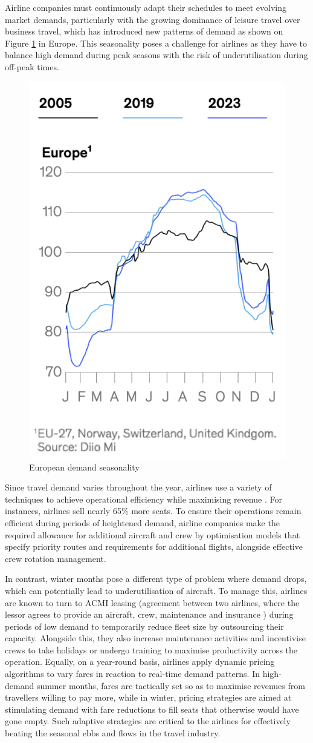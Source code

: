 \documentclass[conference]{IEEEtran}
\begin{document}
Airline companies must continuously adapt their schedules to meet evolving market demands, particularly with the growing dominance of leisure travel over business travel, which has introduced new patterns of demand as shown on Figure \ref{fig:European_demand_seasonality} in Europe. This seasonality poses a challenge for airlines as they have to balance high demand during peak seasons with the risk of underutilisation during off-peak times.

\begin{figure}
    \centering
    \includegraphics[width=.2\textwidth]{Figures/European Demand.png}
    \caption{European demand seasonality \cite{flight_seasonnality_challenges}}
    \label{fig:European_demand_seasonality}
\end{figure}

Since travel demand varies throughout the year, airlines use a variety of techniques to achieve operational efficiency while maximising revenue \cite{flight_seasonnality_challenges}. For instances, airlines sell nearly 65\% more seats. To ensure their operations remain efficient during periods of heightened demand, airline companies make the required allowance for additional aircraft and crew by optimisation models that specify priority routes and requirements for additional flights, alongside effective crew rotation management.

In contrast, winter months pose a different type of problem where demand drops, which can potentially lead to underutilisation of aircraft. To manage this, airlines are known to turn to ACMI leasing (agreement between two airlines, where the lessor agrees to provide an aircraft, crew, maintenance and insurance \cite{acmi_def}) during periods of low demand to temporarily reduce fleet size by outsourcing their capacity. Alongside this, they also increase maintenance activities and incentivise crews to take holidays or undergo training to maximise productivity across the operation. Equally, on a year-round basis, airlines apply dynamic pricing algorithms to vary fares in reaction to real-time demand patterns. In high-demand summer months, fares are tactically set so as to maximise revenues from travellers willing to pay more, while in winter, pricing strategies are aimed at stimulating demand with fare reductions to fill seats that otherwise would have gone empty. Such adaptive strategies are critical to the airlines for effectively beating the seasonal ebbs and flows in the travel industry.
\end{document}

